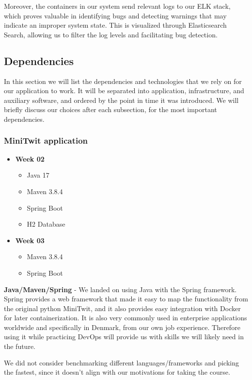Moreover, the containers in our system send relevant logs to our ELK stack, which proves valuable in identifying bugs and detecting warnings that may indicate an improper system state. This is visualized through Elasticsearch Search, allowing us to filter the log levels and facilitating bug detection.

\subsection{Dependencies}
In this section we will list the dependencies and technologies that we rely on for our application to work. It will be separated into application, infrastructure, and auxiliary software, and ordered by the point in time it was introduced. We will briefly discuss our choices after each subsection, for the most important dependencies. 
\subsubsection*{MiniTwit application}
\begin{itemize}
    \item \textbf{Week 02}
    \begin{itemize}
        \item Java 17
        \item Maven 3.8.4
        \item Spring Boot
        \item H2 Database
    \end{itemize}
    \item \textbf{Week 03}
    \begin{itemize}
        \item Maven 3.8.4
        \item Spring Boot
    \end{itemize}
\end{itemize}
\textbf{Java/Maven/Spring} - We landed on using Java with the Spring framework. Spring provides a web framework that made it easy to map the functionality from the original python MiniTwit, and it also provides easy integration with Docker for later containerization. It is also very commonly used in enterprise applications worldwide and specifically in Denmark, from our own job experience. Therefore using it while practicing DevOps will provide us with skills we will likely need in the future.

We did not consider benchmarking different languages/frameworks and picking the fastest, since it doesn't align with our motivations for taking the course. 


